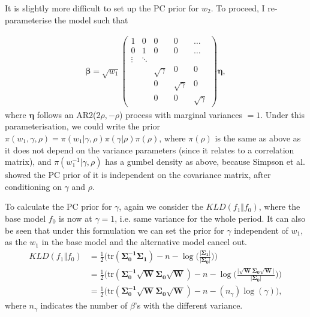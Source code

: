 \documentclass[12pt,a4paper]{article}
\begin{document}
It is slightly more difficult to set up the PC prior for $w_2$. To proceed, I re-parameterise the model such that 

\begin{align*}
\boldsymbol{\beta} = \sqrt{w_1} \begin{pmatrix}
																	1 & 0 & 0 & 0 & \dots \\
																	0 & 1 & 0 & 0 & \dots \\
																	\vdots & \ddots & & & \\
																	& & \sqrt{\gamma} & 0 & 0 \\
																	& & 0 & \sqrt{\gamma} & 0 \\
																	& & 0 & 0 & \sqrt{\gamma}
																	\end{pmatrix} \boldsymbol{\eta},
\end{align*}
where $\boldsymbol{\eta}$ follows an AR2($2\rho, -\rho$) process with marginal variances $= 1$. Under this parameterisation, we could write the prior $\pi(w_1, \gamma, \rho) = \pi(w_1 | \gamma, \rho) \pi(\gamma | \rho) \pi(\rho)$, where $\pi(\rho)$ is the same as above as it does not depend on the variance parameters (since it relates to a correlation matrix), and $\pi(w_1^{-1} | \gamma, \rho)$ has a gumbel density as above, because Simpson et al. showed the PC prior of it is independent on the covariance matrix, after conditioning on $\gamma$ and $\rho$.

To calculate the PC prior for $\gamma$, again we consider the $KLD(f_1 \Vert f_0)$, where the base model $f_0$ is now at $\gamma = 1$, i.e. same variance for the whole period. It can also be seen that under this formulation we can set the prior for $\gamma$ independent of $w_1$, as the $w_1$ in the base model and the alternative model cancel out.
\begin{align*}
KLD(f_1 \Vert f_0) &= \frac{1}{2} \Bigg( \text{tr}(\boldsymbol{\Sigma_0^{-1} \Sigma_1}) - n - \log \Big( \frac{\vert  \boldsymbol{\Sigma_1} \vert}{\vert \boldsymbol{\Sigma_0} \vert} \Big) \Bigg) \\
 &= \frac{1}{2} \Bigg( \text{tr}(\boldsymbol{\Sigma_0^{-1} \sqrt{W} \Sigma_0 \sqrt{W}})- n - \log \Big( \frac{\vert  \boldsymbol{\sqrt{W}\Sigma_0 \sqrt{W}} \vert}{\vert \boldsymbol{\Sigma_0} \vert} \Big) \Bigg)  \\
&= \frac{1}{2} \Bigg( \text{tr}(\boldsymbol{\Sigma_0^{-1} \sqrt{W} \Sigma_0 \sqrt{W}}) - n - (n_{\gamma})\log(\gamma) \Bigg),
\end{align*}
where $n_{\gamma}$ indicates the number of $\beta$'s with the different variance.
\end{document}
